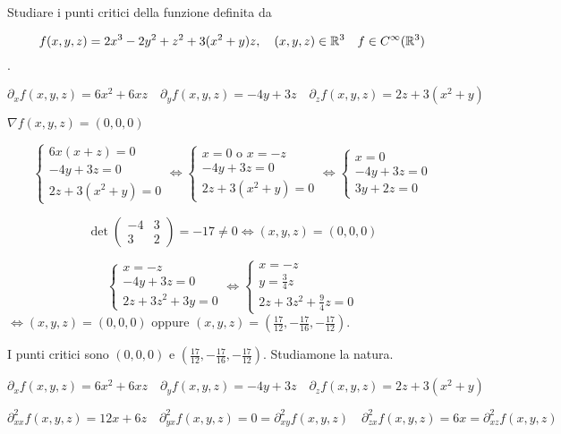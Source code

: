 \begin{exbar}
\begin{example}
	Studiare i punti critici della funzione definita da 
	
	$$f(x,y,z)=2x^3-2y^2+z^2+3(x^2+y)z, \quad (x,y,z)\in \mathbb{R}^3 \quad f\in C^\infty(\mathbb{R}^3)$$.
	
	$$\partial_xf(x,y,z)=6x^2+6xz \quad \partial_yf(x,y,z)=-4y+3z \quad \partial_zf(x,y,z)=2z+3(x^2+y)$$
	
	$\nabla f(x,y,z)=(0,0,0)$
	
	$$\begin{cases}
		6x(x+z)=0\\
		-4y+3z=0\\
		2z+3(x^2+y)=0
	\end{cases}\Leftrightarrow
	\begin{cases}
		x=0\text{  o  }x=-z\\
		-4y+3z=0\\
		2z+3(x^2+y)=0
	\end{cases}\Leftrightarrow
	\begin{cases}
		x=0\\
		-4y+3z=0\\
		3y+2z=0
	\end{cases}$$
	
	$$\det\begin{pmatrix}
		-4&3\\
		3&2
	\end{pmatrix}=-17\neq 0 \Leftrightarrow (x,y,z)=(0,0,0)$$
	
	$$\begin{cases}
		x=-z\\
		-4y+3z=0\\
		2z+3z^2+3y=0
	\end{cases}\Leftrightarrow
	\begin{cases}
		x=-z\\
		y=\frac{3}{4}z\\
		2z+3z^2+\frac{9}{4}z=0
	\end{cases}$$
	$\Leftrightarrow (x,y,z)=(0,0,0)$ oppure $(x,y,z)=(\frac{17}{12},-\frac{17}{16},-\frac{17}{12})$.
	
	I punti critici sono $(0,0,0)$ e $(\frac{17}{12},-\frac{17}{16},-\frac{17}{12})$. Studiamone la natura.
	
	$$\partial_xf(x,y,z)=6x^2+6xz \quad \partial_yf(x,y,z)=-4y+3z \quad \partial_zf(x,y,z)=2z+3(x^2+y)$$
	
	$$\partial_{xx}^2f(x,y,z)=12x+6z \quad \partial_{yx}^2f(x,y,z)=0=\partial_{xy}^2f(x,y,z) \quad \partial_{zx}^2f(x,y,z)=6x=\partial_{xz}^2f(x,y,z)$$
	

\end{example}
\end{exbar}
